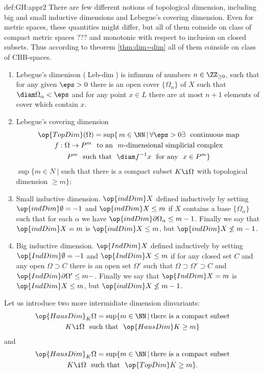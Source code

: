{\begin{subthm}{def:GH:appr2}
 There are few different notions of topological dimension, including big and small inductive dimensions and Lebegue's covering dimension.
Even for metric spaces, these quantities might differ, but all of them coinside on class of compact metric spaces ??? and monotonic with respect to inclusion on closed subsets. 
Thus according to theorem \ref{thm:dim=dim} all of them coinside on class of CBB-spaces.
\begin{enumerate}
\item Lebegue's dimenison ($\text{Leb-}\!\dim$) is infimum of numbers $n\in \ZZ_{\ge0}$, such that for any given $\eps>0$ there is an open cover $\{\Omega_\alpha\}$ of $X$ such that $\diam\Omega_\alpha<\eps$ and for any point $x\in L$ there are at most $n+1$ elements of cover which contain $x$.
\item Lebegue's covering dimension
\begin{multline*}\op{TopDim}(\Omega)=\sup\{\,m\in\NN\,|\,\forall\eps>0\exists\ \ \text{continuous map}\\  f:\Omega\to P^m\ \ \text{to an}\ \  m\text{-dimensional simplicial complex}\\  P^m\ \  \text{such that}\ \  \diam f^{-1}x\ \ \text{for any}\ \  x\in P^m \}
\end{multline*}
$\sup\bigl\{m\in N\ |$ 
such that there is a compact subset $K\i \Omega$ with topological dimension
$\ge m\bigr\}$;
\item Small inductive dimension. $\op{indDim}X$ defined inductively by setting $\op{indDim}\emptyset=-1$ and $\op{indDim}X\le m$ if $X$ contains a base $\{\Omega_\alpha\}$ such that for each $\alpha$ we have $\op{indDim}\partial\Omega_\alpha\le m-1$.
Finally we say that $\op{indDim}X= m$ is $\op{indDim}X\le m$, but $\op{indDim}X\not\le m-1$.

\item Big inductive dimension. $\op{IndDim}X$ defined inductively by setting $\op{IndDim}\emptyset=-1$ and $\op{IndDim}X\le m$ if for any closed set $C$ and any open $\Omega\supset C$ there is an open set $\Omega'$ such that $\Omega\supset\Omega'\supset C$ and $\op{IndDim}\partial\Omega'\le m-$.
Finally we say that $\op{IndDim}X= m$ is $\op{IndDim}X\le m$, but $\op{indDim}X\not\le m-1$.
\end{enumerate}

Let us introduce two more intermidiate dimension dinvariants:
\begin{multline*}
 \op{HausDim}_K\Omega=\sup\{m\in \NN\,|\,\text{there is a compact subset}\\
K\i \Omega\ \ \text{such that}\ \ \op{HausDim}K\ge m\}
\end{multline*}
and
\begin{multline*}
 \op{HausDim}_K\Omega=\sup\{m\in \NN\,|\,\text{there is a compact subset}\\
K\i \Omega\ \ \text{such that}\ \ \op{TopDim}K\ge m\}.
\end{multline*}


\end{subthm}}
